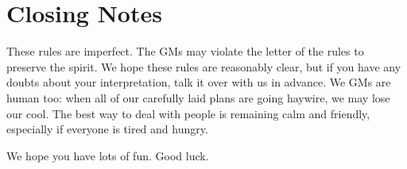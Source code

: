 \documentclass[sheet]{GL2020}
\begin{document}
\section{Closing Notes}

These rules are imperfect.  The GMs may violate the letter of the rules to preserve the spirit.  We hope these rules are reasonably clear, but if you have any doubts about your interpretation, talk it over with us in advance.  We GMs are human too: when all of our carefully laid plans are going haywire, we may lose our cool.  The best way to deal with people is remaining calm and friendly, especially if everyone is tired and hungry.

We hope you have lots of fun.  Good luck.
\end{document}

